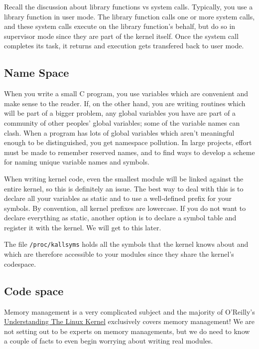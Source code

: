 \documentclass[10pt, oneside]{book}
\begin{document}
Recall the discussion about library functions vs system calls.
Typically, you use a library function in user mode.
The library function calls one or more system calls, and these system calls execute on the library function's behalf, but do so in supervisor mode since they are part of the kernel itself.
Once the system call completes its task, it returns and execution gets transfered back to user mode.

\subsection{Name Space}
\label{sec:namespace}
When you write a small C program, you use variables which are convenient and make sense to the reader.
If, on the other hand, you are writing routines which will be part of a bigger problem, any global variables you have are part of a community of other peoples' global variables; some of the variable names can clash.
When a program has lots of global variables which aren't meaningful enough to be distinguished, you get namespace pollution.
In large projects, effort must be made to remember reserved names, and to find ways to develop a scheme for naming unique variable names and symbols.

When writing kernel code, even the smallest module will be linked against the entire kernel, so this is definitely an issue.
The best way to deal with this is to declare all your variables as static and to use a well-defined prefix for your symbols.
By convention, all kernel prefixes are lowercase. If you do not want to declare everything as static, another option is to declare a symbol table and register it with the kernel.
We will get to this later.

The file \verb|/proc/kallsyms| holds all the symbols that the kernel knows about and which are therefore accessible to your modules since they share the kernel's codespace.

\subsection{Code space}
\label{sec:codespace}
Memory management is a very complicated subject and the majority of O'Reilly's \href{https://www.oreilly.com/library/view/understanding-the-linux/0596005652/}{Understanding The Linux Kernel} exclusively covers memory management!
We are not setting out to be experts on memory managements, but we do need to know a couple of facts to even begin worrying about writing real modules.
\end{document}
